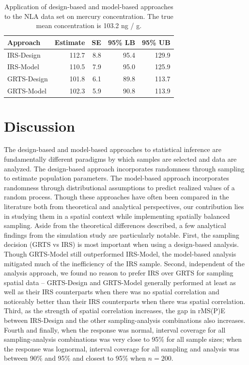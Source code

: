 \documentclass[]{elsarticle} %
\begin{document}
\begin{table}[ht]
\centering
\begin{tabular}{lrrrr}
  \hline
Approach & Estimate & SE & 95\% LB & 95\% UB \\ 
  \hline
IRS-Design & 112.7 & 8.8 & 95.4 & 129.9 \\ 
  IRS-Model & 110.5 & 7.9 & 95.0 & 125.9 \\ 
  GRTS-Design & 101.8 & 6.1 & 89.8 & 113.7 \\ 
  GRTS-Model & 102.3 & 5.9 & 90.8 & 113.9 \\ 
   \hline
\end{tabular}
\caption{\label{tab:appliedtab} Application of design-based and model-based approaches to the NLA data set on mercury concentration. The true mean concentration is 103.2 ng / g.} 
\end{table}

\hypertarget{sec:discussion}{%
\section{Discussion}\label{sec:discussion}}

The design-based and model-based approaches to statistical inference are
fundamentally different paradigms by which samples are selected and data
are analyzed. The design-based approach incorporates randomness through
sampling to estimate population parameters. The model-based approach
incorporates randomness through distributional assumptions to predict
realized values of a random process. Though these approaches have often
been compared in the literature both from theoretical and analytical
perspectives, our contribution lies in studying them in a spatial
context while implementing spatially balanced sampling. Aside from the
theoretical differences described, a few analytical findings from the
simulation study are particularly notable. First, the sampling decision
(GRTS vs IRS) is most important when using a design-based analysis.
Though GRTS-Model still outperformed IRS-Model, the model-based analysis
mitigated much of the inefficiency of the IRS sample. Second,
independent of the analysis approach, we found no reason to prefer IRS
over GRTS for sampling spatial data -- GRTS-Design and GRTS-Model
generally performed at least as well as their IRS counterparts when
there was no spatial correlation and noticeably better than their IRS
counterparts when there was spatial correlation. Third, as the strength
of spatial correlation increases, the gap in rMS(P)E between IRS-Design
and the other sampling-analysis combinations also increases. Fourth and
finally, when the response was normal, interval coverage for all
sampling-analysis combinations was very close to 95\% for all sample
sizes; when the response was lognormal, interval coverage for all
sampling and analysis was between 90\% and 95\% and closest to 95\% when
\(n = 200\).
\end{document}
